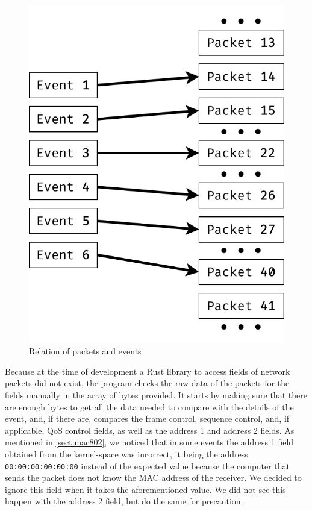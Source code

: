 \begin{figure}[htb]
   \centering
   \includegraphics[scale=.35]{relate}
   \caption{Relation of packets and events}\label{fig:pktrel}
\end{figure}

Because at the time of development a Rust library to access fields of network
packets did not exist, the program checks the raw data of the packets for the
fields manually in the array of bytes provided. It starts by making sure that
there are enough bytes to get all the data needed to compare with the details of
the event, and, if there are, compares the frame control, sequence control, and,
if applicable, \ac{QoS} control fields, as well as the address 1 and address 2
fields. As mentioned in \autoref{sect:mac802}, we noticed that in some events
the address 1 field obtained from the kernel-space was incorrect, it being the
address \texttt{00:00:00:00:00:00} instead of the expected value because the
computer that sends the packet does not know the \ac{MAC} address of the
receiver. We decided to ignore this field when it takes the aforementioned
value. We did not see this happen with the address 2 field, but do the same for
precaution.


